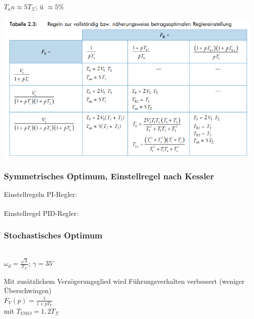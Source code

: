 $ T_an \approx 5 T_{\Sigma}$; ü $\approx 5 \%$

\includegraphics[scale = 0.5]{themen/pict/betragsoptimal.png}

\subsubsection{Symmetrisches Optimum, Einstellregel nach Kessler}


\begin{minipage}{0.45\textwidth}
  Einstellregeln PI-Regler:\\
  \\
  Einstellregel PID-Regler:\\
\end{minipage}
\begin{minipage}{0.45\textwidth}

\end{minipage}


\subsubsection{Stochastisches Optimum}

\begin{minipage}{0.45\textwidth}
  \\
  $\omega_d = \frac{\sqrt{2}}{T_{\Sigma}}$; $ \gamma = 35^\circ$

  Mit zusätzlichem Verzögerungsglied wird Führungsverhalten verbessert (weniger Überschwingen)\\
  $F_V(p) = \frac{1}{1+pT_V} $ \\
  mit $T_{VStO} = 1,2 T_{\Sigma}$
\end{minipage}
\begin{minipage}{0.45\textwidth}
\end{minipage}


